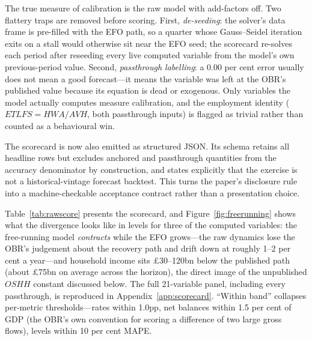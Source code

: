 The true measure of calibration is the raw model with add-factors off. Two flattery traps are removed before scoring. First, \emph{de-seeding}: the solver's data frame is pre-filled with the EFO path, so a quarter whose Gauss--Seidel iteration exits on a stall would otherwise sit near the EFO seed; the scorecard re-solves each period after reseeding every live computed variable from the model's own previous-period value. Second, \emph{passthrough labelling}: a 0.00 per cent error usually does not mean a good forecast---it means the variable was left at the OBR's published value because its equation is dead or exogenous. Only variables the model actually computes measure calibration, and the employment identity ($ETLFS = HWA/AVH$, both passthrough inputs) is flagged as trivial rather than counted as a behavioural win.

The scorecard is now also emitted as structured JSON. Its schema retains all
headline rows but excludes anchored and passthrough quantities from the accuracy
denominator by construction, and states explicitly that the exercise is not a
historical-vintage forecast backtest. This turns the paper's disclosure rule
into a machine-checkable acceptance contract rather than a presentation choice.

Table~\ref{tab:rawscore} presents the scorecard, and Figure~\ref{fig:freerunning} shows what the divergence looks like in levels for three of the computed variables: the free-running model \emph{contracts} while the EFO grows---the raw dynamics lose the OBR's judgement about the recovery path and drift down at roughly 1--2 per cent a year---and household income sits \pounds 30--120bn below the published path (about \pounds 75bn on average across the horizon), the direct image of the unpublished $OSHH$ constant discussed below. The full 21-variable panel, including every passthrough, is reproduced in Appendix~\ref{app:scorecard}. ``Within band'' collapses per-metric thresholds---rates within 1.0pp, net balances within 1.5 per cent of GDP (the OBR's own convention for scoring a difference of two large gross flows), levels within 10 per cent MAPE.

